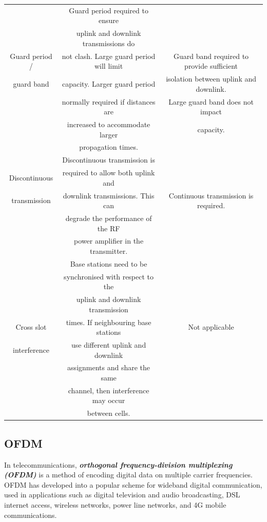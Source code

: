 \documentclass[conference]{IEEEtran}
\begin{document}
\begin{table}[htbp]
\begin{tabular}{c c c}
		\hline
		&Guard period required to ensure &\\
		&uplink and downlink transmissions do &\\
		Guard period / &not clash. Large guard period will limit &Guard band required to provide sufficient \\
		guard band&capacity. Larger guard period &isolation between uplink and downlink. \\
		&normally required if distances are &Large guard band does not impact \\
		&increased to accommodate larger &capacity.\\
		&propagation times.&\\
		\hline
		&Discontinuous transmission is &\\
		Discontinuous &required to allow both uplink and &\\
		transmission&downlink transmissions. This can &Continuous transmission is required.\\
		&degrade the performance of the RF &\\
		&power amplifier in the transmitter.&\\
		\hline
		&Base stations need to be &\\
		&synchronised with respect to the &\\
		&uplink and downlink transmission &\\
		Cross slot &times. If neighbouring base stations &Not applicable\\
		interference&use different uplink and downlink &\\
		&assignments and share the same &\\
		&channel, then interference may occur &\\
		&between cells.&\\
		\hline \hline 
	\end{tabular}
\end{table}

\subsection{OFDM}
In telecommunications, {\bfseries{\emph{orthogonal frequency-division multiplexing (OFDM)}}} is a method of encoding digital data on multiple carrier frequencies. OFDM has developed into a popular scheme for wideband digital communication, used in applications such as digital television and audio broadcasting, DSL internet access, wireless networks, power line networks, and 4G mobile communications.
\end{document}
